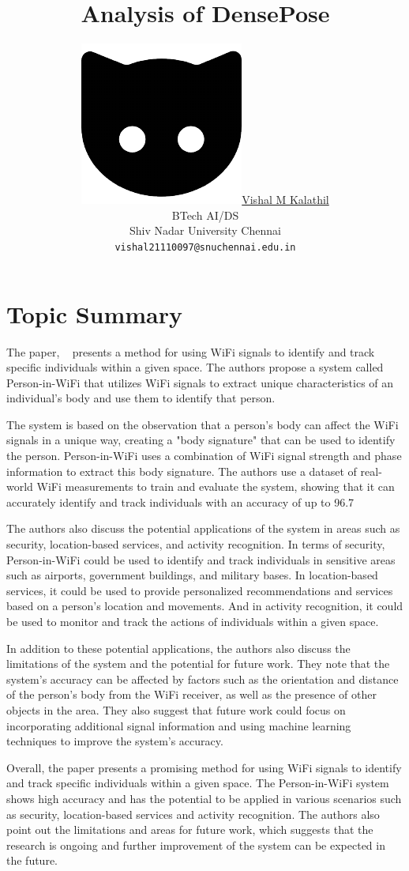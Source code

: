 \documentclass{article}
\title{Analysis of DensePose}
\author{ \href{https://github.com/SharkLava}{\includegraphics[scale=0.06]{cat.pdf}\hspace{1mm}Vishal M Kalathil}
	\\BTech AI/DS\\
	Shiv Nadar University Chennai\\
	\texttt{vishal21110097@snuchennai.edu.in} \\
}
\begin{document}
\maketitle



\section{Topic Summary}
\label{sec:summary}
The paper, ~\cite{DensePose} presents a method for using WiFi signals to identify and track specific individuals within a given space. The authors propose a system called Person-in-WiFi that utilizes WiFi signals to extract unique characteristics of an individual's body and use them to identify that person.

The system is based on the observation that a person's body can affect the WiFi signals in a unique way, creating a "body signature" that can be used to identify the person. Person-in-WiFi uses a combination of WiFi signal strength and phase information to extract this body signature. The authors use a dataset of real-world WiFi measurements to train and evaluate the system, showing that it can accurately identify and track individuals with an accuracy of up to 96.7%

The authors also discuss the potential applications of the system in areas such as security, location-based services, and activity recognition. In terms of security, Person-in-WiFi could be used to identify and track individuals in sensitive areas such as airports, government buildings, and military bases. In location-based services, it could be used to provide personalized recommendations and services based on a person's location and movements. And in activity recognition, it could be used to monitor and track the actions of individuals within a given space.

In addition to these potential applications, the authors also discuss the limitations of the system and the potential for future work. They note that the system's accuracy can be affected by factors such as the orientation and distance of the person's body from the WiFi receiver, as well as the presence of other objects in the area. They also suggest that future work could focus on incorporating additional signal information and using machine learning techniques to improve the system's accuracy.

Overall, the paper presents a promising method for using WiFi signals to identify and track specific individuals within a given space. The Person-in-WiFi system shows high accuracy and has the potential to be applied in various scenarios such as security, location-based services and activity recognition. The authors also point out the limitations and areas for future work, which suggests that the research is ongoing and further improvement of the system can be expected in the future.
\end{document}
